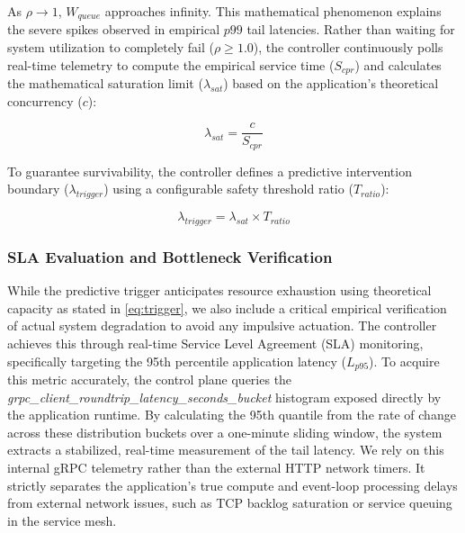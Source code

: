 \documentclass{ieeeaccess}
\begin{document}
As $\rho \to 1$, $W_{queue}$ approaches infinity. This mathematical phenomenon explains the severe spikes observed in empirical $p99$ tail latencies. Rather than waiting for system utilization to completely fail ($\rho \ge 1.0$), the controller continuously polls real-time telemetry to compute the empirical service time ($S_{cpr}$) and calculates the mathematical saturation limit ($\lambda_{sat}$) based on the application's theoretical concurrency ($c$):

\begin{equation}
	\lambda_{sat} = \frac{c}{S_{cpr}}
\end{equation}

To guarantee survivability, the controller defines a predictive intervention boundary ($\lambda_{trigger}$) using a configurable safety threshold ratio ($T_{ratio}$):

\begin{equation}
	\label{eq:trigger}
	\lambda_{trigger} = \lambda_{sat} \times T_{ratio}
\end{equation}

\subsubsection{SLA Evaluation and Bottleneck Verification} 
While the predictive trigger anticipates resource exhaustion using theoretical capacity as stated in \eqref{eq:trigger}, we also include a critical empirical verification of actual system degradation to avoid any impulsive actuation. The controller achieves this through real-time Service Level Agreement (SLA) monitoring, specifically targeting the 95th percentile application latency ($L_{p95}$). To acquire this metric accurately, the control plane queries the \textit{grpc\_client\_roundtrip\_latency\_\break seconds\_bucket} histogram exposed directly by the application runtime. By calculating the 95th quantile from the rate of change across these distribution buckets over a one-minute sliding window, the system extracts a stabilized, real-time measurement of the tail latency. We rely on this internal gRPC telemetry rather than the external HTTP network timers. It strictly separates the application's true compute and event-loop processing delays from external network issues, such as TCP backlog saturation or service queuing in the service mesh.
\end{document}

